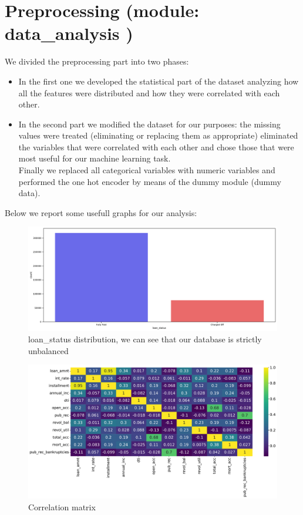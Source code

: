 \documentclass[french]{scrartcl}
\begin{document}
\section{Preprocessing (module: data\_analysis )}
We divided the preprocessing part into two phases: 
\begin{itemize}
	\item In the first one we developed the statistical part of the dataset analyzing how all the features were distributed and how they were correlated with each other.
	\item In the second part we modified the dataset for our purposes: the missing values were treated (eliminating or replacing them as appropriate) eliminated the variables that were correlated with each other and chose those that were most useful for our machine learning task.\\
	Finally we replaced all categorical variables with numeric variables and performed the one hot encoder by means of the dummy module (dummy data).\\
\end{itemize}
Below we report some usefull graphs for our analysis:
	\begin{figure}[h!]
		\centering
		\includegraphics[scale=0.3]{figures/(1)pf_vs_co.pdf}
		\caption{loan\_status distribution, we can see that our database is strictly unbalanced}
	\end{figure}
	\begin{figure}[h!]
	    \centering
	    \includegraphics[scale=0.3]{figures/(2)corr_matrix}
	    \caption{Correlation matrix}
	\end{figure}
\end{document}
